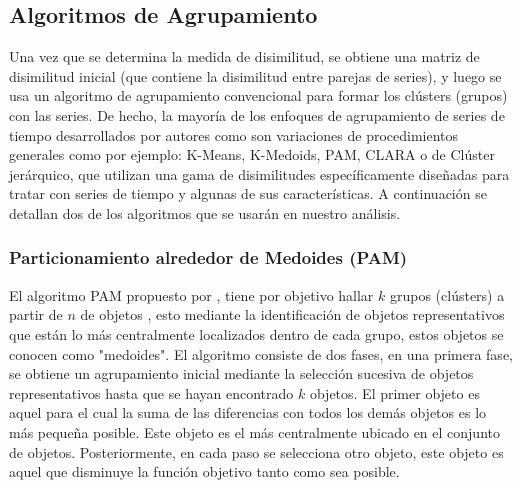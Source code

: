\documentclass[12pt,oneside]{book}\usepackage[]{graphicx}\usepackage[]{color}
\theoremstyle{definition} %
\begin{document}

\subsection{Algoritmos de Agrupamiento}

Una vez que se determina la medida de disimilitud, se obtiene una matriz de disimilitud inicial (que contiene la disimilitud entre parejas de series), y luego se usa un algoritmo de agrupamiento convencional para formar los clústers (grupos) con las series. De hecho, la mayoría de los enfoques de agrupamiento de series de tiempo desarrollados por autores como \citeauthor{liao2005clustering} \citeyear{liao2005clustering} son variaciones de procedimientos generales como por ejemplo: K-Means, K-Medoids, PAM, CLARA \citeauthor{kaufman1986clustering} \citeyear{kaufman1986clustering} o de Clúster jerárquico, que utilizan una gama de disimilitudes específicamente diseñadas para tratar con series de tiempo y algunas de sus características. A continuación se detallan dos de los algoritmos que se usarán en nuestro análisis.

\subsubsection{Particionamiento alrededor de Medoides (PAM)}








El algoritmo PAM propuesto por \citeauthor{rousseeuw1990finding} \citeyear{rousseeuw1990finding}, tiene por objetivo hallar $k$ grupos (clústers) a partir de $n$ de objetos , esto mediante la identificación de objetos representativos que están lo más centralmente localizados dentro de cada grupo, estos objetos se conocen como "medoides". El algoritmo consiste de dos fases, en una primera fase, 
se obtiene un agrupamiento inicial mediante la selección sucesiva de objetos representativos hasta que se hayan encontrado $k$ objetos. El primer objeto es aquel para el cual la suma de las diferencias con todos los demás objetos es lo más pequeña posible. Este objeto es el más centralmente ubicado en el conjunto de objetos. Posteriormente, en cada paso se selecciona otro objeto, este objeto es aquel que disminuye la función objetivo tanto como sea posible. 
\end{document}
